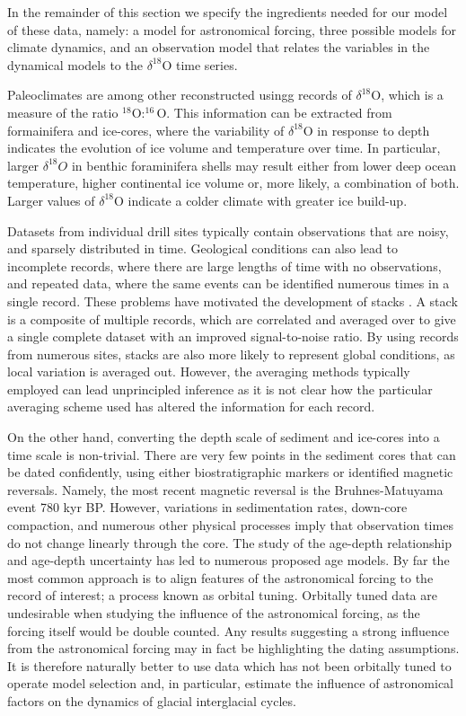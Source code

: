 \documentclass[a4paper,12pt]{article}
\newcommand{\spp}[1]{\par\medskip\noindent\fbox{\parbox{\textwidth}{\textbf{Comment by SPP}: #1 }}\medskip}
\begin{document}
In the remainder of this section we specify the ingredients needed for our model of these 
data, namely: a model for astronomical forcing, three possible models for climate
dynamics, and an observation model that relates the variables in the dynamical models to the 
$\delta^{18}\mbox{O}$ time series. 


\spp{Anything alse needed from below?}

\color{gray}

Paleoclimates are among other reconstructed usingg records of $\delta^{18}$O, which is a measure of the ratio
$^{18}\mbox{O}:^{16}\mbox{O}$.  This information can be extracted from formainifera and ice-cores, where the
variability of $\delta^{18}$O in response to depth indicates the evolution of ice volume and temperature over time.  In
particular, larger $\delta^{18}O$ in benthic foraminifera shells may result either from lower deep ocean temperature,
higher continental ice volume or, more likely, a combination of both.  Larger values of $\delta^{18}$O indicate a
colder climate with greater ice build-up.


Datasets from individual drill sites typically contain observations that are noisy, and sparsely distributed in time.
Geological conditions can also lead to incomplete records, where there are large lengths of time with no observations, and repeated data, where the same events can be identified numerous times in a single record.
These problems have motivated the development of stacks \cite{Lisiecki2005,Huybers2007}.
A stack is a composite of multiple records, which are correlated and averaged over to give a single complete dataset with an improved signal-to-noise ratio.
By using records from numerous sites, stacks are also more likely to represent global conditions, as local variation is averaged out.
However, the averaging methods typically employed can lead unprincipled inference as it is not clear how the particular averaging scheme used has altered the information for each record.

On the other hand, 
converting the depth scale of sediment and ice-cores into a time scale is non-trivial.
There are very few points in the sediment cores that can be dated confidently, using either biostratigraphic markers or identified magnetic reversals. Namely, the most recent magnetic reversal is the Bruhnes-Matuyama event 780 kyr BP. However, variations in sedimentation rates, down-core compaction, and numerous other physical processes imply that observation times do not change linearly through the core.
The study of the age-depth relationship and age-depth uncertainty has led to numerous proposed age models.
By far the most common approach is to align features of the astronomical forcing to the record of interest; a process known as orbital tuning.
Orbitally tuned data are undesirable when studying the influence of the astronomical forcing, as the forcing itself would be double counted.
Any results suggesting a strong influence from the astronomical forcing may in fact be highlighting the dating assumptions.
It is therefore naturally better to use data which has not been orbitally tuned to operate model selection and, in particular, estimate the influence of astronomical factors on the dynamics of glacial interglacial cycles.
\end{document}
